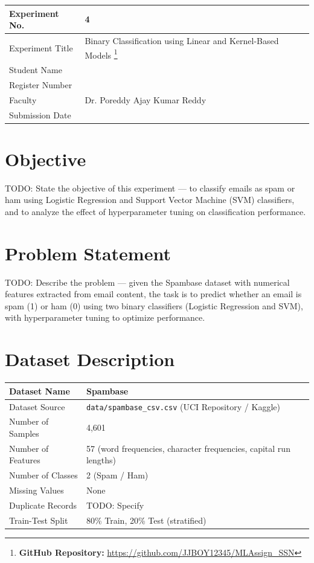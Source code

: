 \documentclass[12pt,a4paper]{article}
\begin{document}
\begin{tabular}{|p{4cm}|p{11cm}|}
\hline
Experiment No. & 4 \\ \hline
Experiment Title &
Binary Classification using Linear and Kernel-Based Models
\footnote{\textbf{GitHub Repository: }\url{https://github.com/JJBOY12345/MLAssign_SSN}}\\ \hline
Student Name & \\ \hline
Register Number & \\ \hline
Faculty & Dr. Poreddy Ajay Kumar Reddy \\ \hline
Submission Date & \\ \hline
\end{tabular}

\section{Objective}
TODO: State the objective of this experiment — to classify emails as spam or ham using Logistic Regression and Support Vector Machine (SVM) classifiers, and to analyze the effect of hyperparameter tuning on classification performance.

\section{Problem Statement}
TODO: Describe the problem — given the Spambase dataset with numerical features extracted from email content, the task is to predict whether an email is spam (1) or ham (0) using two binary classifiers (Logistic Regression and SVM), with hyperparameter tuning to optimize performance.

\section{Dataset Description}
\begin{longtable}{|p{5cm}|p{9cm}|}
\hline
Dataset Name & Spambase \\ \hline
Dataset Source & \texttt{data/spambase\_csv.csv} (UCI Repository / Kaggle) \\ \hline
Number of Samples & 4,601 \\ \hline
Number of Features & 57 (word frequencies, character frequencies, capital run lengths) \\ \hline
Number of Classes & 2 (Spam / Ham) \\ \hline
Missing Values & None \\ \hline
Duplicate Records & TODO: Specify \\ \hline
Train-Test Split & 80\% Train, 20\% Test (stratified) \\ \hline
\end{longtable}
\end{document}
